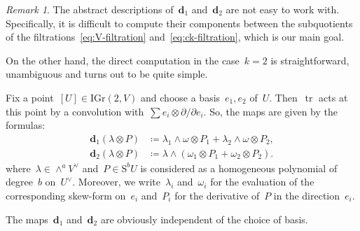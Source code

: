 \documentclass[a4paper]{article}
\newcommand{\IGr}{\mathrm{IGr}}
\newcommand{\Sy}{\mathrm{S}}
\newcommand{\vn}{\mathbf{d}}
\theoremstyle{remark}
\newtheorem{remark}[theorem]{Remark}
\theoremstyle{definition}
\begin{document}
\begin{remark}
	The abstract descriptions of~\(\vn_1\) and~\(\vn_2\) are not easy to work with. Specifically, it is difficult to compute their components between the subquotients of the filtrations~\eqref{eq:V-filtration} and~\eqref{eq:ck-filtration}, which is our main goal. 
	
	On the other hand, the direct computation in the case~\(k=2\) is straightforward, unambiguous and turns out to be quite simple. 
\end{remark}

Fix a point~\([U] \in \IGr(2,V)\) and choose a basis~\(e_1,e_2\) of~\(U\). 
Then~\(\operatorname{tr}\) acts at this point by a convolution with~\(\sum e_i \otimes \partial/\partial e_i\).
So, the maps are given by the formulas:
\begin{align}
\label{eq:def-v1}
\vn_1(\lambda \otimes P) & \coloneqq 
\lambda_1 \wedge \omega \otimes P_1 + 
\lambda_2 \wedge \omega \otimes P_2,
\\
\label{eq:def-v2}
\vn_2(\lambda \otimes P) & \coloneqq 
\lambda \wedge (\omega_1 \otimes P_1 + \omega_2 \otimes P_2).
\end{align}
where~\(\lambda \in \wedge^aV^\vee\) and~\(P \in \Sy^b U\) is considered as a homogeneous polynomial of degree~\(b\) on~\(U^\vee\).
Moreover, we write~\(\lambda_i\) and~\(\omega_i\) for the evaluation of the corresponding skew-form on~\(e_i\)
and~\(P_i\) for the derivative of~\(P\) in the direction~\(e_i\).

The maps~\(\vn_1\) and~\(\vn_2\) are obviously independent of the choice of basis.
\end{document}
